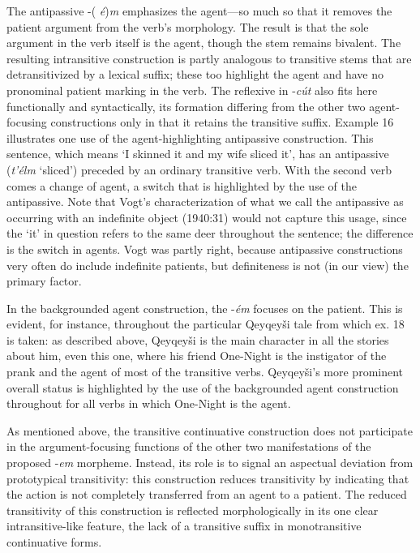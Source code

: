 \documentclass[output=paper,colorlinks,citecolor=brown]{langscibook}
\begin{document}
The antipassive -(\emph{ \'e})\emph{m} emphasizes the agent---so much
so that it removes the patient argument from the verb's morphology.
The result is that the sole argument in the verb itself is the agent,
though the stem remains bivalent.  The resulting intransitive
construction is partly analogous to transitive stems that are
detransitivized by a lexical suffix; these too highlight the agent and
have no pronominal patient marking in the verb.  The reflexive in
-\emph{c\'ut} also fits here functionally and syntactically, its
formation differing from the other two agent-focusing constructions
only in that it retains the transitive suffix.  Example 16 illustrates
one use of the agent-highlighting antipassive construction.  This
sentence, which means `I skinned it and my wife sliced it', has an
antipassive (\emph{t'\'elm} `sliced') preceded by an ordinary
transitive verb.  With the second verb comes a change of agent, a
switch that is highlighted by the use of the antipassive.  Note that
Vogt's characterization of what we call the antipassive as occurring
with an indefinite object (1940:31) would not capture this usage,
since the `it' in question refers to the same deer throughout the
sentence; the difference is the switch in agents.  Vogt was partly
right, because antipassive constructions very often do include
indefinite patients, but definiteness is not (in our view) the primary
factor.


In the backgrounded agent construction, the -\emph{\'em} focuses on the
patient.  This is evident, for instance, throughout the particular
Qeyqey\v{s}i tale from which ex. 18 is taken: as described above,
Qeyqey\v{s}i is the main character in all the stories about him, even
this one, where his friend One-Night is the instigator of the prank
and the agent of most of the transitive verbs.  Qeyqey\v{s}i's more
prominent overall status is highlighted by the use of the backgrounded
agent construction throughout for all verbs in which One-Night is the
agent.


As mentioned above, the transitive continuative construction does not
participate in the argument-focusing functions of the other two
manifestations of the proposed -\emph{em} morpheme.  Instead, its
role is to signal an aspectual deviation from prototypical
transitivity: this construction reduces transitivity by indicating
that the action is not completely transferred from an agent to a
patient.  The reduced transitivity of this construction is reflected
morphologically in its one clear intransitive-like feature, the lack
of a transitive suffix in monotransitive continuative forms.
\end{document}
